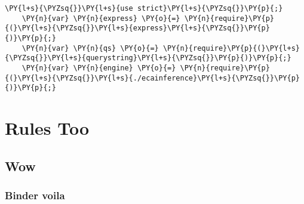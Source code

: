 \begin{appendices}
    \begin{Verbatim}[fontsize=\small,commandchars=\\\{\}]
    \PY{l+s}{\PYZsq{}}\PY{l+s}{use strict}\PY{l+s}{\PYZsq{}}\PY{p}{;}
    \PY{n}{var} \PY{n}{express} \PY{o}{=} \PY{n}{require}\PY{p}{(}\PY{l+s}{\PYZsq{}}\PY{l+s}{express}\PY{l+s}{\PYZsq{}}\PY{p}{)}\PY{p}{;}
    \PY{n}{var} \PY{n}{qs} \PY{o}{=} \PY{n}{require}\PY{p}{(}\PY{l+s}{\PYZsq{}}\PY{l+s}{querystring}\PY{l+s}{\PYZsq{}}\PY{p}{)}\PY{p}{;}
    \PY{n}{var} \PY{n}{engine} \PY{o}{=} \PY{n}{require}\PY{p}{(}\PY{l+s}{\PYZsq{}}\PY{l+s}{./ecainference}\PY{l+s}{\PYZsq{}}\PY{p}{)}\PY{p}{;}
    \end{Verbatim}


\chapter{Rules Too}
\section{Wow}
\subsection{Binder voila}
\end{appendices}
